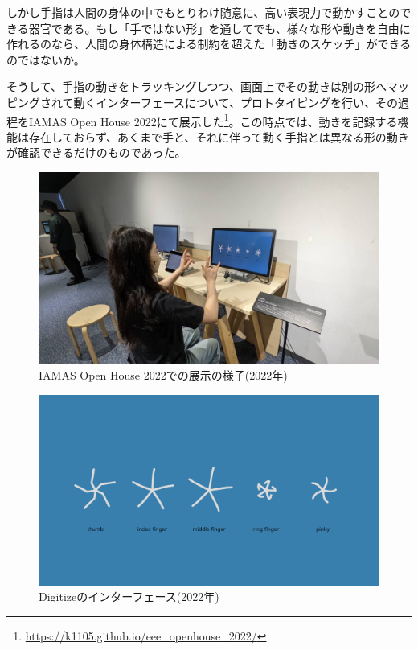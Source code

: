 しかし手指は人間の身体の中でもとりわけ随意に、高い表現力で動かすことのできる器官である。もし「手ではない形」を通してでも、様々な形や動きを自由に作れるのなら、人間の身体構造による制約を超えた「動きのスケッチ」ができるのではないか。

そうして、手指の動きをトラッキングしつつ、画面上でその動きは別の形へマッピングされて動くインターフェースについて、プロトタイピングを行い、その過程をIAMAS Open House 2022にて展示した\footnote{\url{https://k1105.github.io/eee_openhouse_2022/}}。この時点では、動きを記録する機能は存在しておらず、あくまで手と、それに伴って動く手指とは異なる形の動きが確認できるだけのものであった。

\begin{figure}[H]
  \centering
  \includegraphics[width=15cm]{img/openhouse2022.jpeg}
  \caption{IAMAS Open House 2022での展示の様子(2022年)}
  \label{fig:exhibit_2022}
\end{figure}

\begin{figure}[H]
  \centering
  \includegraphics[width=15cm]{img/openhouse2022_interface.png}
  \caption{Digitizeのインターフェース(2022年)}
  \label{fig:exhibit_2022_interface}
\end{figure}

